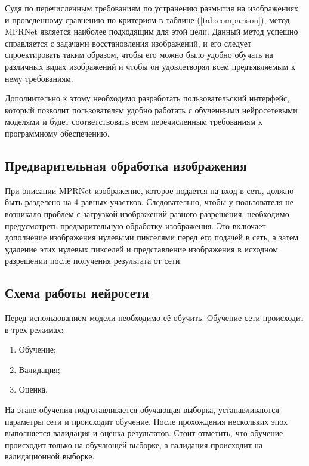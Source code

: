 Судя по перечисленным требованиям по устранению размытия на изображениях и проведенному сравнению по критериям в таблице (\ref{tab:comparison}), метод MPRNet является наиболее подходящим для этой цели. Данный метод успешно справляется с задачами восстановления изображений, и его следует спроектировать таким образом, чтобы его можно было удобно обучать на различных видах изображений и чтобы он удовлетворял всем предъявляемым к нему требованиям.

Дополнительно к этому необходимо разработать пользовательский интерфейс, который позволит пользователям удобно работать с обученными нейросетевыми моделями и будет соответствовать всем перечисленным требованиям к программному обеспечению.

\subsection{Предварительная обработка изображения}

При описании MPRNet изображение, которое подается на вход в сеть, должно быть разделено на 4 равных участков. Следовательно, чтобы у пользователя не возникало проблем с загрузкой изображений разного разрешения, необходимо предусмотреть предварительную обработку изображения. Это включает дополнение изображения нулевыми пикселями перед его подачей в сеть, а затем удаление этих нулевых пикселей и представление изображения в исходном разрешении после получения результата от сети.


\subsection{Схема работы нейросети}

Перед использованием модели необходимо её обучить. Обучение сети происходит в трех режимах:

\begin{enumerate}
	\item Обучение;
	\item Валидация;
	\item Оценка.
\end{enumerate}

На этапе обучения подготавливается обучающая выборка, устанавливаются параметры сети и происходит обучение. После прохождения нескольких эпох выполняется валидация и оценка результатов. Стоит отметить, что обучение происходит только на обучающей выборке, а валидация происходит на валидационной выборке.

